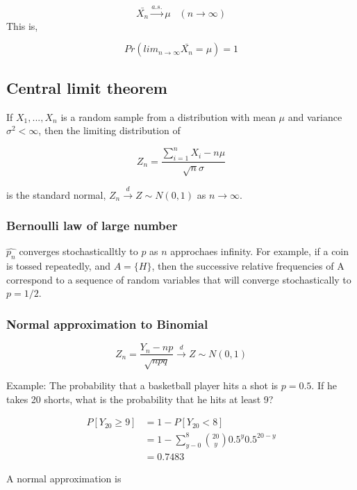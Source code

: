 \documentclass[
]{book}
\begin{document}
\[\bar{X_n} \xrightarrow{a.s.} \mu \; \; \; (n \rightarrow \infty)\]
This is,

\[Pr(lim_{n \rightarrow \infty} \bar{X_n}=\mu)=1\]

\hypertarget{central-limit-theorem}{%
\subsection{Central limit theorem}\label{central-limit-theorem}}

If \(X_1,...,X_n\) is a random sample from a distribution with mean \(\mu\) and variance \(\sigma^2 < \infty\), then the limiting distribution of

\[Z_n=\frac{\sum_{i=1}^n X_i - n\mu}{\sqrt{n} \sigma}\]

is the standard normal, \(Z_n \xrightarrow{d} Z \sim N(0,1)\) as \(n \rightarrow \infty\).

\hypertarget{bernoulli-law-of-large-number}{%
\subsubsection{Bernoulli law of large number}\label{bernoulli-law-of-large-number}}

\(\hat{p_n}\) converges stochasticalltly to \(p\) as \(n\) approchaes infinity. For example, if a coin is tossed repeatedly, and \(A=\{H\}\), then the successive relative frequencies of A correspond to a sequence of random variables that will converge stochastically to \(p=1/2\).

\hypertarget{normal-approximation-to-binomial}{%
\subsubsection{Normal approximation to Binomial}\label{normal-approximation-to-binomial}}

\[Z_n=\frac{Y_n-np}{\sqrt{npq}} \xrightarrow{d} Z \sim N(0, 1)\]

Example: The probability that a basketball player hits a shot is \(p=0.5\). If he takes 20 shorts, what is the probability that he hits at least 9?

\[\begin{aligned} P[Y_{20} \geq 9] &=1-P[Y_{20} < 8] \\ &=1- \sum_{y-0}^8 \binom{20}{y} 0.5^y0.5^{20-y} \\&=0.7483 \end{aligned} \]

A normal approximation is
\end{document}
